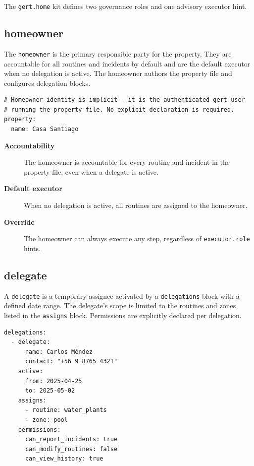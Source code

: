 The \texttt{gert.home} kit defines two governance roles and one advisory executor hint.

\subsection{homeowner}

The \texttt{homeowner} is the primary responsible party for the property. They are accountable
for all routines and incidents by default and are the default executor when no delegation is
active. The homeowner authors the property file and configures delegation blocks.

\begin{verbatim}
# Homeowner identity is implicit — it is the authenticated gert user
# running the property file. No explicit declaration is required.
property:
  name: Casa Santiago
\end{verbatim}

\begin{description}
  \item[\textbf{Accountability}] The homeowner is accountable for every routine and incident
        in the property file, even when a delegate is active.
  \item[\textbf{Default executor}] When no delegation is active, all routines are assigned
        to the homeowner.
  \item[\textbf{Override}] The homeowner can always execute any step, regardless of
        \texttt{executor.role} hints.
\end{description}

\subsection{delegate}

A \texttt{delegate} is a temporary assignee activated by a \texttt{delegations} block with a
defined date range. The delegate's scope is limited to the routines and zones listed in the
\texttt{assigns} block. Permissions are explicitly declared per delegation.

\begin{verbatim}
delegations:
  - delegate:
      name: Carlos Méndez
      contact: "+56 9 8765 4321"
    active:
      from: 2025-04-25
      to: 2025-05-02
    assigns:
      - routine: water_plants
      - zone: pool
    permissions:
      can_report_incidents: true
      can_modify_routines: false
      can_view_history: true
\end{verbatim}

